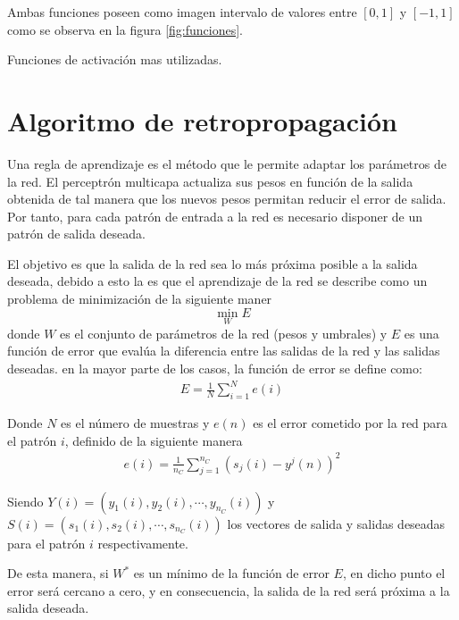 Ambas funciones poseen como imagen intervalo de valores entre $[0, 1]$ y $[-1, 1]$ como se observa en la figura \ref{fig:funciones}.%

\begin{imagen}
	\scalebox{1.0}{}
	\caption{Funciones de activación mas utilizadas.}
	\label{fig:funciones}
\end{imagen}





\section{Algoritmo de retropropagación}
Una regla de aprendizaje es el método que le permite adaptar los parámetros de la red. El perceptrón multicapa actualiza sus pesos en función de la salida obtenida de tal manera que los nuevos pesos permitan reducir el error de salida. Por tanto, para cada patrón de entrada a la red es necesario disponer de un patrón de salida deseada.

El objetivo es que la salida de la red sea lo más próxima posible a la salida deseada, debido a esto la es que el aprendizaje de la red se describe como un problema de minimización de la siguiente maner $$ \min_{W} E $$ donde $W$ es el conjunto de parámetros de la red (pesos y umbrales) y $E$ es una función de error que evalúa la diferencia entre las salidas de la red y las salidas deseadas. en la mayor parte de los casos, la función de error se define como:
\begin{eqnarray}
	E = \frac{1}{N}\sum^{N}_{i = 1} e(i)
\end{eqnarray}

Donde $N$ es el número de muestras y $e(n)$ es el error cometido por la red para el patrón $i$, definido de la siguiente manera
\begin{eqnarray}
	e(i) = \frac{1}{n_{C}}\sum^{n_{C}}_{j = 1} (s_{j}(i) - y^{j}(n))^2\label{eq:error_patron}
\end{eqnarray}

Siendo $Y(i) = (y_{1}(i), y_{2}(i), \cdots, y_{n_{C}}(i))$ y $S(i) = (s_{1}(i), s_{2}(i), \cdots, s_{n_{C}}(i))$ los vectores de salida y salidas deseadas para el patrón $i$ respectivamente.

De esta manera, si $W^{*}$ es un mínimo de la función de error $E$, en dicho punto el error será cercano a cero, y en consecuencia, la salida de la red será próxima a la salida deseada.

